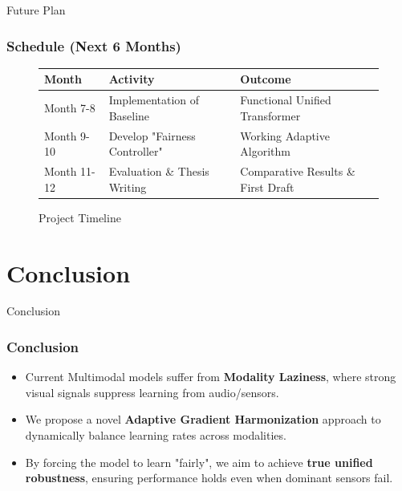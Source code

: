 \documentclass[serif, aspectratio=169]{beamer}
\begin{document}
\begin{frame}{Future Plan}
    \frametitle<presentation>{Schedule (Next 6 Months)}
    \begin{figure}
        \centering
        \begin{tabular}{|l|l|l|}
        \hline
        \textbf{Month} & \textbf{Activity} & \textbf{Outcome} \\ \hline
        Month 7-8 & Implementation of Baseline & Functional Unified Transformer \\ \hline
        Month 9-10 & Develop "Fairness Controller" & Working Adaptive Algorithm \\ \hline
        Month 11-12 & Evaluation \& Thesis Writing & Comparative Results \& First Draft \\ \hline
        \end{tabular}
        \caption{Project Timeline}
    \end{figure}
\end{frame}

\section{Conclusion}
\begin{frame}{Conclusion}
    \frametitle<presentation>{Conclusion}
    \begin{itemize}
        \item \justifying Current Multimodal models suffer from \textbf{Modality Laziness}, where strong visual signals suppress learning from audio/sensors.
        \item \justifying We propose a novel \textbf{Adaptive Gradient Harmonization} approach to dynamically balance learning rates across modalities.
        \item \justifying By forcing the model to learn "fairly", we aim to achieve \textbf{true unified robustness}, ensuring performance holds even when dominant sensors fail.
    \end{itemize}
\end{frame}

\end{document}
